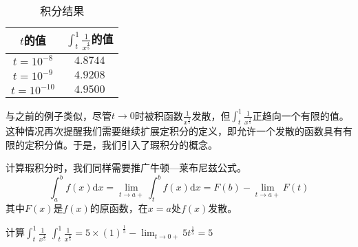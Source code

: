 \begin{table}[ht]
\centering
\caption{积分结果}\label{impro_tab2}
\begin{tabular}{|c|c|}
\hline
$t$的值 & $\int_t^1 \frac{1}{x^{\frac{4}{5}}}$的值 \\
\hline
$t=10^{-8}$ & $4.8744$ \\
\hline
$t=10^{-9}$  & $4.9208$ \\
\hline
$t=10^{-10}$  & $4.9500$ \\
\hline
\end{tabular}
\end{table}
与之前的例子类似，尽管$t\to0$时被积函数$\frac{1}{x^{\frac{4}{5}}}$发散，但$\int_t^1 \frac{1}{x^{\frac{4}{5}}}$正趋向一个有限的值。这种情况再次提醒我们需要继续扩展定积分的定义，即允许一个发散的函数具有有限的定积分值。于是，我们引入了瑕积分的概念。


计算瑕积分时，我们同样需要推广牛顿—莱布尼兹公式。
\begin{equation}
\displaystyle \int ^{b}_a f(x)\mathrm{d} x=\lim_{t\rightarrow a+}\int _t^{b}f(x)\mathrm{d} x
= F(b) - \lim_{t\rightarrow a+ }F(t)
\end{equation}
其中$F(x)$是$f(x)$的原函数，在$x=a$处$f(x)$发散。

\begin{example}{计算$\int_t^1 \frac{1}{x^{\frac{4}{5}}}$}
$\int_t^1 \frac{1}{x^{\frac{4}{5}}} = 5\times(1)^{\frac{1}{5}} - \lim_{t\rightarrow 0+ }5t^{\frac{1}{5}}=5$
\end{example}
